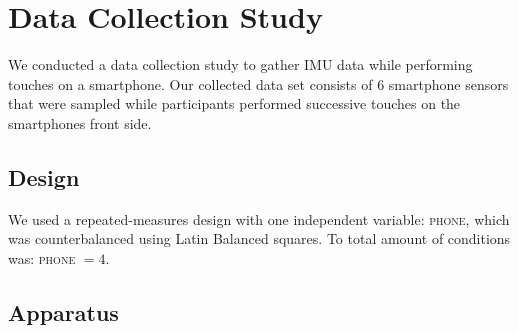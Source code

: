 \section{Data Collection Study}
We conducted a data collection study to gather IMU data while performing touches on a smartphone.
Our collected data set consists of 6 smartphone sensors that were sampled while participants performed successive touches on the smartphones front side. 
\subsection{Design}
We used a repeated-measures design with one independent variable: \textsc{phone}, which was counterbalanced using Latin Balanced squares. To total amount of conditions was: \textsc{phone} $ = 4$.
\subsection{Apparatus}

